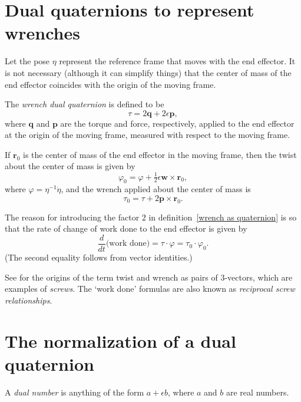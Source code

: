 \documentclass[reqno,12pt]{amsart}
\begin{document}
\section{Dual quaternions to represent wrenches}

Let the pose $\eta$ represent the reference frame that moves with the end effector.  It is not necessary (although it can simplify things) that the center of mass of the end effector coincides with the origin of the moving frame.

The \emph{wrench dual quaternion} is defined to be
\begin{equation}
\label{wrench as quaternion}
\tau = 2 \bm q + 2 \epsilon \bm p,
\end{equation}
where $\bm q$ and $\bm p$ are the torque and force, respectively, applied to the end effector at the origin of the moving frame, measured with respect to the moving frame.

If $\bm r_0$ is the center of mass of the end effector in the moving frame, then the twist about the center of mass is given by
\begin{equation}
\label{twist correction}
\varphi_0 = 
\varphi + \tfrac12\epsilon\bm w \times \bm r_0,
\end{equation}
where $\varphi = \eta^{-1} \dot \eta$, and the wrench applied about the center of mass is
\begin{equation}
\label{torque correction}
\tau_0 = 
\tau + 2 \bm p \times \bm r_0.
\end{equation}

The reason for introducing the factor $2$ in definition~\eqref{wrench as quaternion} is so that the rate of change of work done to the end effector is given by
\begin{equation}
\label{dot h tau varphi}
\frac{d}{dt} \text{(work done)} = \tau \cdot \varphi = \tau_0 \cdot \varphi_0 .
\end{equation}
(The second equality follows from vector identities.)

See \cite{ball} for the origins of the term twist and wrench as pairs of 3-vectors, which are examples of \emph{screws}.  The `work done' formulas are also known as \emph{reciprocal screw relationships}.

\section{The normalization of a dual quaternion}

A \emph{dual number} is anything of the form $a + \epsilon b$, where $a$ and $b$ are real numbers.
\end{document}
